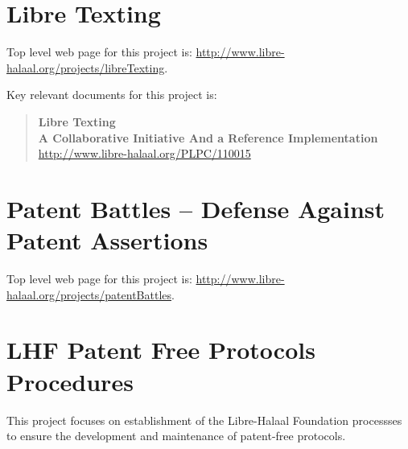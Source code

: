 \section{Libre Texting}

Top level web page for this project is: \href{http://www.libre-halaal.org/projects/libreTexting}{http://www.libre-halaal.org/projects/libreTexting}.

Key relevant documents for this project is:

\begin{quote}
  \textbf{Libre Texting}\\
  \textbf{A Collaborative Initiative And a Reference Implementation}\\
  \href{http://www.libre-halaal.org/PLPC/110015}{http://www.libre-halaal.org/PLPC/110015}
\end{quote}

\section{Patent Battles -- Defense Against Patent Assertions}

Top level web page for this project is: \href{http://www.libre-halaal.org/projects/patentBattles}{http://www.libre-halaal.org/projects/patentBattles}.






\section{LHF Patent Free Protocols Procedures}

This project focuses on establishment of the Libre-Halaal Foundation
processses to ensure the development and maintenance of patent-free protocols.

